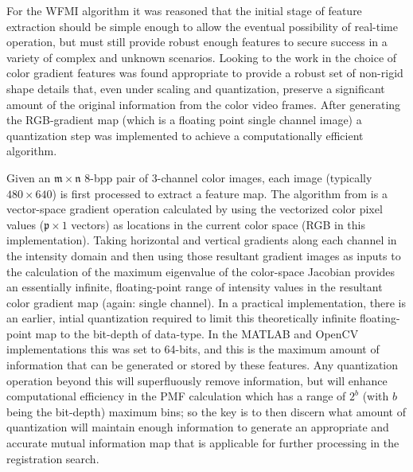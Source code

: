 %
%
%
%
%
%
%
%
%

%
%
%



For the WFMI algorithm it was reasoned that the initial stage of feature extraction should be simple enough to allow the eventual possibility of real-time operation, but must still provide robust enough features to secure success in a variety of complex and unknown scenarios. Looking to the work in \cite{Ugarriza2009} the choice of color gradient features was found appropriate to provide a robust set of non-rigid shape details that, even under scaling and quantization, preserve a significant amount of the original information from the color video frames. After generating the RGB-gradient map (which is a floating point single channel image) a quantization step was implemented to achieve a computationally efficient algorithm.

Given an $\mathfrak{m}\times\mathfrak{n}$ 8-bpp pair of 3-channel color images, each  image (typically $480\times640$) is first processed to extract a feature map. The algorithm from \cite{Lee1991} is a vector-space gradient operation calculated by using the vectorized color pixel values ($\mathfrak{p}\times1$ vectors) as locations in the current color space (\ie RGB in this implementation). Taking horizontal and vertical gradients along each channel in the intensity domain and then using those resultant gradient images as inputs to the calculation of the maximum eigenvalue of the color-space Jacobian provides an essentially infinite, floating-point range of intensity values in the resultant color gradient map (again: single channel). In a practical implementation, there is an earlier, intial quantization required to limit this theoretically infinite floating-point map to the bit-depth of data-type. In the MATLAB\textsuperscript{\textregistered} and OpenCV implementations this was set to 64-bits, and this is the maximum amount of information that can be generated or stored by these features. Any quantization operation beyond this will superfluously remove information, but will enhance computational efficiency in the PMF calculation which has a range of $2^{b}$ (with $b$ being the bit-depth) maximum bins; so the key is to then discern what amount of quantization will maintain enough information to generate an appropriate and accurate mutual information map that is applicable for further processing in the registration search.

